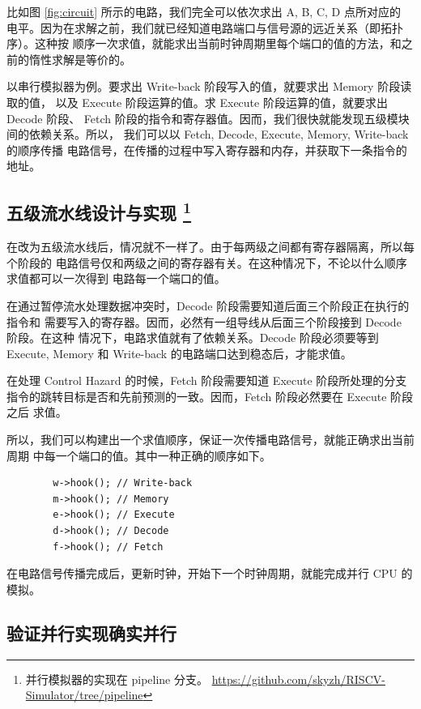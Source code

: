 \documentclass[12pt]{article}
\begin{document}
    比如图 \ref{fig:circuit} 所示的电路，我们完全可以依次求出 A, B, C, D 点所对应的
    电平。因为在求解之前，我们就已经知道电路端口与信号源的远近关系（即拓扑序）。这种按
    顺序一次求值，就能求出当前时钟周期里每个端口的值的方法，和之前的惰性求解是等价的。

    以串行模拟器为例。要求出 Write-back 阶段写入的值，就要求出 Memory 阶段读取的值，
    以及 Execute 阶段运算的值。求 Execute 阶段运算的值，就要求出 Decode 阶段、
    Fetch 阶段的指令和寄存器值。因而，我们很快就能发现五级模块间的依赖关系。所以，
    我们可以以 Fetch, Decode, Execute, Memory, Write-back 的顺序传播
    电路信号，在传播的过程中写入寄存器和内存，并获取下一条指令的地址。

    \subsection{五级流水线设计与实现\protect
    \footnote{并行模拟器的实现在 pipeline 分支。
    \url{https://github.com/skyzh/RISCV-Simulator/tree/pipeline}}}

    在改为五级流水线后，情况就不一样了。由于每两级之间都有寄存器隔离，所以每个阶段的
    电路信号仅和两级之间的寄存器有关。在这种情况下，不论以什么顺序求值都可以一次得到
    电路每一个端口的值。
    
    在通过暂停流水处理数据冲突时，Decode 阶段需要知道后面三个阶段正在执行的指令和
    需要写入的寄存器。因而，必然有一组导线从后面三个阶段接到 Decode 阶段。在这种
    情况下，电路求值就有了依赖关系。Decode 阶段必须要等到 Execute, Memory
    和 Write-back 的电路端口达到稳态后，才能求值。

    在处理 Control Hazard 的时候，Fetch 阶段需要知道 Execute 阶段所处理的分支
    指令的跳转目标是否和先前预测的一致。因而，Fetch 阶段必然要在 Execute 阶段之后
    求值。

    所以，我们可以构建出一个求值顺序，保证一次传播电路信号，就能正确求出当前周期
    中每一个端口的值。其中一种正确的顺序如下。

    \begin{verbatim}
        w->hook(); // Write-back
        m->hook(); // Memory
        e->hook(); // Execute
        d->hook(); // Decode
        f->hook(); // Fetch
    \end{verbatim}

    在电路信号传播完成后，更新时钟，开始下一个时钟周期，就能完成并行 CPU 的模拟。

    \subsection{验证并行实现确实并行}
\end{document}
